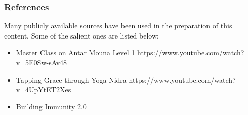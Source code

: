 

\begin{frame}[fragile]\frametitle{References}

Many publicly available sources have been used in the preparation of this content. Some of the salient ones are listed below:

	\begin{itemize}
	\item Master Class on Antar Mouna Level 1 https://www.youtube.com/watch?v=5E0Sw-sAv48
	\item Tapping Grace through Yoga Nidra  https://www.youtube.com/watch?v=4UpYtET2Xes
	\item Building Immunity 2.0 
	\end{itemize}

\end{frame}





